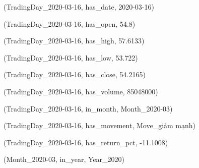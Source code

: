 (TradingDay\_2020-03-16, has\_date, 2020-03-16)\par
(TradingDay\_2020-03-16, has\_open, 54.8)\par
(TradingDay\_2020-03-16, has\_high, 57.6133)\par
(TradingDay\_2020-03-16, has\_low, 53.722)\par
(TradingDay\_2020-03-16, has\_close, 54.2165)\par
(TradingDay\_2020-03-16, has\_volume, 85048000)\par
(TradingDay\_2020-03-16, in\_month, Month\_2020-03)\par
(TradingDay\_2020-03-16, has\_movement, Move\_giảm mạnh)\par
(TradingDay\_2020-03-16, has\_return\_pct, -11.1008)\par
(Month\_2020-03, in\_year, Year\_2020)\par
